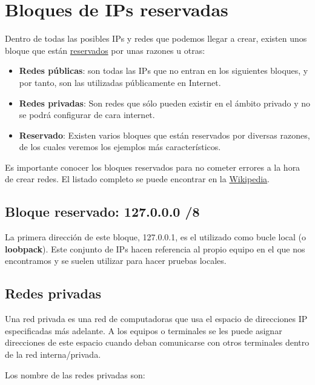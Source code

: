 \section{Bloques de IPs reservadas}
Dentro de todas las posibles IPs y redes que podemos llegar a crear, existen unos bloque que están \href{https://en.wikipedia.org/wiki/Reserved_IP_addresses}{reservados} por unas razones u otras:

\begin{itemize}
    \item \textbf{Redes públicas}: son todas las IPs que no entran en los siguientes bloques, y por tanto, son las utilizadas públicamente en Internet.

    \item \textbf{Redes privadas}: Son redes que sólo pueden existir en el ámbito privado y no se podrá configurar de cara internet.

    \item \textbf{Reservado}: Existen varios bloques que están reservados por diversas razones, de los cuales veremos los ejemplos más característicos.
\end{itemize}

Es importante conocer los bloques reservados para no cometer errores a la hora de crear redes. El listado completo se puede encontrar en la \href{https://es.wikipedia.org/wiki/IPv4#Direcciones_de_uso_especial}{Wikipedia}.


\subsection{Bloque reservado: 127.0.0.0 /8}

La primera dirección de este bloque, 127.0.0.1, es el utilizado como bucle local (o \textbf{loobpack}). Este conjunto de IPs hacen referencia al propio equipo en el que nos encontramos y se suelen utilizar para hacer pruebas locales.


\subsection{Redes privadas}

Una red privada es una red de computadoras que usa el espacio de direcciones IP especificadas más adelante. A los equipos o terminales se les puede asignar direcciones de este espacio cuando deban comunicarse con otros terminales dentro de la red interna/privada.

Los nombre de las redes privadas son:

